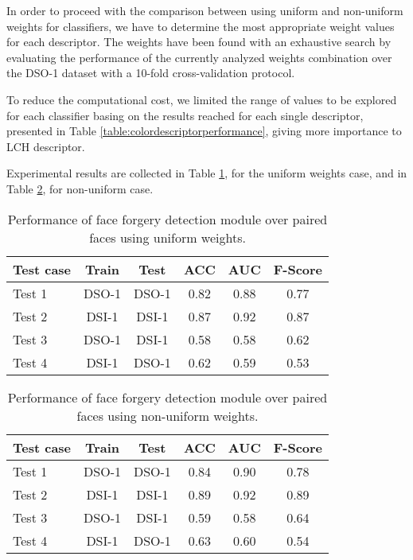 In order to proceed with the comparison between using uniform and non-uniform weights for classifiers, we have to determine the most appropriate weight values for each descriptor. The weights have been found with an exhaustive search by evaluating the performance of the currently analyzed weights combination over the DSO-1 dataset with a 10-fold cross-validation protocol. 

To reduce the computational cost, we limited the range of values to be explored for each classifier basing on the results reached for each single descriptor, presented in Table \ref{table:colordescriptorperformance}, giving more importance to LCH descriptor.

Experimental results are collected in Table \ref{table:performancefacedet}, for the uniform weights case, and in Table \ref{table:performancefacedetnonun}, for non-uniform case. 

\begin{table}[h!]
\centering
\begin{tabular}{l c c c c c} 
\hline \hline 
\textbf{Test case} & \textbf{Train} & \textbf{Test} & \textbf{ACC} & \textbf{AUC} &\textbf{ F-Score} \\ [0.5ex]
\hline
Test 1 & DSO-1 & DSO-1 &	0.82 & 0.88	& 0.77\\
Test 2 & DSI-1 & DSI-1 &	0.87 & 0.92 & 0.87\\
Test 3 &	DSO-1 &	DSI-1 &	0.58 & 0.58 & 0.62\\
Test 4 &	DSI-1 & DSO-1 & 0.62 & 0.59 & 0.53\\ [1ex]
\hline
\end{tabular}
\caption{Performance of face forgery detection module over paired faces using uniform weights.}
\label{table:performancefacedet}
\end{table}

\begin{table}[h!]
\centering
\begin{tabular}{l c c c c c} 
\hline \hline 
\textbf{Test case} & \textbf{Train} & \textbf{Test} & \textbf{ACC} & \textbf{AUC} &\textbf{ F-Score} \\ [0.5ex]
\hline
Test 1 & DSO-1 & DSO-1 &	0.84 & 0.90	& 0.78\\
Test 2 & DSI-1 & DSI-1 &	0.89 & 0.92 & 0.89\\
Test 3 &	DSO-1 &	DSI-1 &	0.59 & 0.58 & 0.64\\
Test 4 &	DSI-1 & DSO-1 & 0.63 & 0.60 & 0.54\\ [1ex]
\hline
\end{tabular}
\caption{Performance of face forgery detection module over paired faces using non-uniform weights.}
\label{table:performancefacedetnonun}
\end{table}

